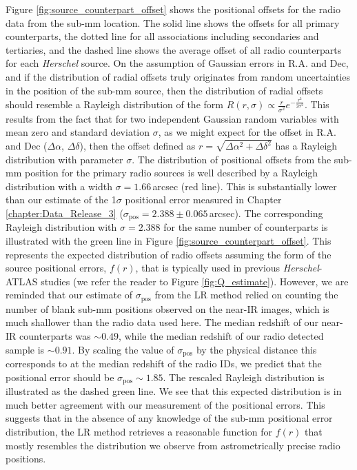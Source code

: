 Figure \ref{fig:source_counterpart_offset} shows the positional offsets for the radio data from the sub-mm location. The solid line shows the offsets for all primary counterparts, the dotted line for all associations including secondaries and tertiaries, and the dashed line shows the average offset of all radio counterparts for each \textit{Herschel} source. On the assumption of Gaussian errors in R.A. and Dec, and if the distribution of radial offsets truly originates from random uncertainties in the position of the sub-mm source, then the distribution of radial offsets should resemble a Rayleigh distribution of the form $R(r, \sigma) \propto \frac{r}{\sigma^2}e^{-\frac{r^2}{2\sigma^2}}$. This results from the fact that for two independent Gaussian random variables with mean zero and standard deviation $\sigma$, as we might expect for the offset in R.A. and Dec ($\Delta\alpha$, $\Delta\delta$), then the offset defined as $r = \sqrt{\Delta\alpha^2 + \Delta\delta^2}$ has a Rayleigh distribution with parameter $\sigma$. The distribution of positional offsets from the sub-mm position for the primary radio sources is well described by a Rayleigh distribution with a width $\sigma = 1.66\,$arcsec (red line). This is substantially lower than our estimate of the 1$\sigma$ positional error measured in Chapter \ref{chapter:Data_Release_3} ($\sigma_{\textrm{pos}} = 2.388\pm0.065$\,arcsec). The corresponding Rayleigh distribution with $\sigma = 2.388$ for the same number of counterparts is illustrated with the green line in Figure \ref{fig:source_counterpart_offset}. This represents the expected distribution of radio offsets assuming the form of the source positional errors, $f(r)$, that is typically used in previous \textit{Herschel}-ATLAS studies (we refer the reader to Figure \ref{fig:Q_estimate}). {\color{red}However, we are reminded that our estimate of $\sigma_{\textrm{pos}}$ from the LR method relied on counting the number of blank sub-mm positions observed on the near-IR images, which is much shallower than the radio data used here. The median redshift of our near-IR counterparts was $\sim 0.49$, while the median redshift of our radio detected sample is $\sim 0.91$. By scaling the value of $\sigma_{\textrm{pos}}$ by the physical distance this corresponds to at the median redshift of the radio IDs, we predict that the positional error should be $\sigma_{\textrm{pos}} \sim 1.85$. The rescaled Rayleigh distribution is illustrated as the dashed green line. We see that this expected distribution is in much better agreement with our measurement of the positional errors. This suggests that in the absence of any knowledge of the sub-mm positional error distribution, the LR method retrieves a reasonable function for $f(r)$ that mostly resembles the distribution we observe from astrometrically precise radio positions.}


